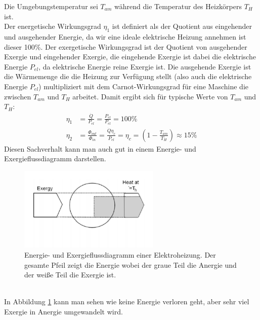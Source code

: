 \begin{addmargin}[25pt]{0pt}     
Die Umgebungstemperatur sei $T_{\si{am}}$ während die Temperatur des Heizkörpers $T_{\si{H}}$ ist.\\ 
Der energetische Wirkungsgrad $\eta_1$ ist definiert als der Quotient aus eingehender und ausgehender Energie, da wir eine ideale elektrische Heizung annehmen ist dieser 100\%. Der exergetische Wirkungsgrad ist der Quotient von ausgehender Exergie und eingehender Exergie, die eingehende Exergie ist dabei die elektrische Energie $P_{\si{el}}$, da elektrische Energie reine Exergie ist. Die ausgehende Exergie ist die Wärmemenge die die Heizung zur Verfügung stellt (also auch die elektrische Energie $P_{\si{el}}$) multipliziert mit dem Carnot-Wirkungsgrad für eine Maschine die zwischen $T_{\si{am}}$ und $T_{\si{H}}$ arbeitet. Damit ergibt sich für typische Werte von $T_{\si{am}}$ und $T_{\si{H}}$:
\begin{align}\label{eq:eta1_elektroheizung}
    \eta_1 &= \frac{\dot{Q}}{P_{\si{el}}} = \frac{P_{\si{el}}}{P_{\si{el}}} = 100\% \\ \label{eq:eta2_elektroheizung}
    \eta_2 &= \frac{\Phi_{\si{out}}}{\Phi_{\si{in}}}=\frac{\dot{Q}\eta_c}{P_{\si{el}}} = \eta_c = \left( 1- \frac{T_{\si{am}}}{T_{\si{H}}}\right) \approx 15\%
\end{align}
Diesen Sachverhalt kann man auch gut in einem Energie- und Exergieflussdiagramm darstellen.
\begin{figure}[h]
    \centering
    \includegraphics[width = 0.6\textwidth]{images/Energiewissenschaften/Exergiefluss_Elektroheizung.png}
    \caption{Energie- und Exergieflussdiagramm einer Elektroheizung. Der gesamte Pfeil zeigt die Energie wobei der graue Teil die Anergie und der weiße Teil die Exergie ist.}
    \label{fig:Exergeifluss_Elektroheizung}
\end{figure}\\
In Abbildung \ref{fig:Exergeifluss_Elektroheizung} kann man sehen wie keine Energie verloren geht, aber sehr viel Exergie in Anergie umgewandelt wird.\\
\end{addmargin}

